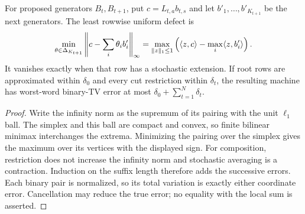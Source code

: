 \begin{proposition}\label{prop:hankel-dual}
For proposed generators $B_t,B_{t+1}$, put $c=L_{t,a}b_{t,s}$ and let
$b'_1,\ldots,b'_{K_{t+1}}$ be the next generators. The least rowwise
uniform defect is
\begin{equation}\label{eq:row-defect}
 \min_{\theta\in\Delta_{K_{t+1}}}\left\|c-\sum_i\theta_i b'_i\right\|_\infty
 =\max_{\|z\|_1\le1}\left(\langle z,c\rangle-\max_i\langle z,b'_i\rangle\right).
\end{equation}
It vanishes exactly when that row has a stochastic extension. If root
rows are approximated within $\delta_0$ and every cut restriction within
$\delta_t$, the resulting machine has worst-word binary-TV error at
most $\delta_0+\sum_{t=1}^N\delta_t$.
\end{proposition}
\begin{proof}
Write the infinity norm as the supremum of its pairing with the unit
$\ell_1$ ball. The simplex and this ball are compact and convex, so finite
bilinear minimax interchanges the extrema. Minimizing the pairing over
the simplex gives the maximum over its vertices with the displayed sign.
For composition, restriction does not increase the infinity norm and
stochastic averaging is a contraction. Induction on the suffix length
therefore adds the successive errors. Each binary pair is normalized,
so its total variation is exactly either coordinate error. Cancellation
may reduce the true error; no equality with the local sum is asserted.
\end{proof}

